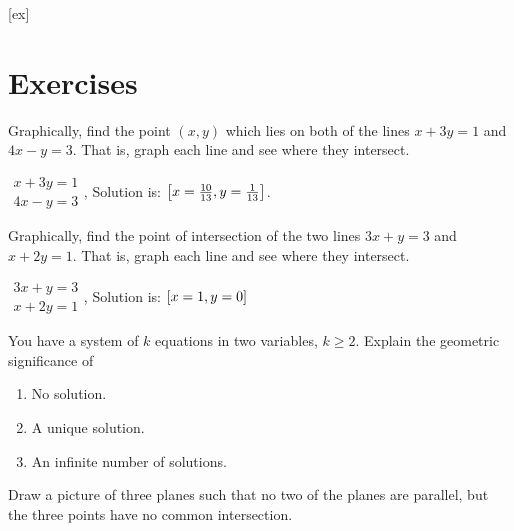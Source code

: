 [ex]
\section*{Exercises}

\begin{enumialphparenastyle}

\begin{ex}
Graphically, find the point $(x,y)$ which
lies on both of the lines $x+3y=1$ and $4x-y=3$. That is, graph each line
and see where they intersect.

\begin{sol}
$\begin{array}{c}
x+3y=1 \\
4x-y=3
\end{array}$, Solution is: $\left[x=\frac{10}{13},y=\frac{1}{13}\right]$.
\end{sol}
\end{ex}


\begin{ex}
Graphically, find the point of intersection of the two lines $
3x+y=3$ and $x+2y=1$. That is, graph each line
and see where they intersect. 

\begin{sol}
$\begin{array}{c}
3x+y=3 \\
x+2y=1
\end{array}
$, Solution is: $\left[x=1,y=0\right] $
\end{sol}
\end{ex}

\begin{ex} You have a system of $k$ equations in two variables, $k\geq 2$.
Explain the geometric significance of

\begin{enumerate}
\item No solution.

\item A unique solution.

\item An infinite number of solutions.
\end{enumerate}

\end{ex}

\begin{ex}
  Draw a picture of three planes such that no two of the planes are
  parallel, but the three points have no common intersection.


\end{ex}
\end{enumialphparenastyle}
